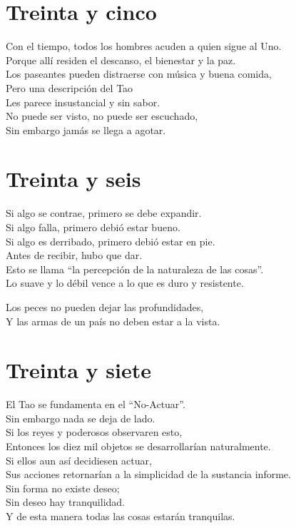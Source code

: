 \documentclass[hidelinks]{memoir}
\begin{document}
	\chapter*{Treinta y cinco}
	
	Con el tiempo, todos los hombres acuden a quien sigue al Uno.\\
	Porque allí residen el descanso, el bienestar y la paz.\\
	Los paseantes pueden distraerse con música y buena comida,\\
	Pero una descripción del Tao\\
	Les parece insustancial y sin sabor.\\
	No puede ser visto, no puede ser escuchado,\\
	Sin embargo jamás se llega a agotar.
	
	\chapter*{Treinta y seis}
	
	Si algo se contrae, primero se debe expandir.\\
	Si algo falla, primero debió estar bueno.\\
	Si algo es derribado, primero debió estar en pie.\\
	Antes de recibir, hubo que dar.\\
	Esto se llama ``la percepción de la naturaleza de las cosas''.\\
	Lo suave y lo débil vence a lo que es duro y resistente.
	
	Los peces no pueden dejar las profundidades,\\
	Y las armas de un país no deben estar a la vista.
	
	\chapter*{Treinta y siete}
	
	El Tao se fundamenta en el ``No-Actuar''.\\
	Sin embargo nada se deja de lado.\\
	Si los reyes y poderosos observaren esto,\\
	Entonces los diez mil objetos se desarrollarían naturalmente.\\
	Si ellos aun así decidiesen actuar,\\
	Sus acciones retornarían a la simplicidad de la sustancia informe.\\
	Sin forma no existe deseo;\\
	Sin deseo hay tranquilidad.\\
	Y de esta manera todas las cosas estarán tranquilas.
	
\end{document}
